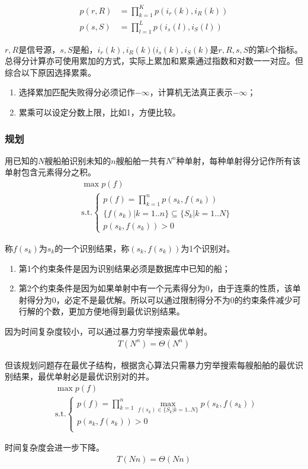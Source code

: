 \begin{align}
	p(r,R)	&	=\prod\limits_{k=1}^Kp(i_r(k),i_R(k))	\\
	p(s,S)	&	=\prod\limits_{l=1}^Lp(i_s(l),i_S(l))
\end{align}
\par \(r,R\)是信号源，\(s,S\)是船，\(i_r(k),i_R(k)(i_s(k),i_S(k)\)是\(r,R,s,S\)的第\(k\)个指标。
\\\indent 总得分计算亦可使用累加的方式，实际上累加和累乘通过指数和对数一一对应。但综合以下原因选择累乘。
\begin{enumerate}
	\item 选择累加匹配失败得分必须记作\(-\infty\)，计算机无法真正表示\(-\infty\)；
	\item 累乘可以设定分数上限，比如1，方便比较。
\end{enumerate}
\subsubsection{规划}
用已知的\(N\)艘船舶识别未知的\(n\)艘船舶一共有\(N^n\)种单射，每种单射得分记作所有该单射包含元素得分之积。
\begin{align}
	&	\max p(f)		\\
	&	\mathrm{s.t.}
	\begin{cases}
		p(f)=\prod\limits_{k=1}^np(s_k,f(s_k))		\\
		\{f(s_k)|k=1..n\}\subseteq\{S_k|k=1..N\}		\\
		p(s_k,f(s_k))>0
	\end{cases}
\end{align}
\par 称\(f(s_k)\)为\(s_k\)的一个识别结果，称\((s_k,f(s_k))\)为1个识别对。
\begin{enumerate}
	\item 第1个约束条件是因为识别结果必须是数据库中已知的船；
	\item 第2个约束条件是因为如果单射中有一个元素得分为0，由于连乘的性质，该单射得分为0，必定不是最优解。所以可以通过限制得分不为0的约束条件减少可行解的个数，更加方便地得到最优识别结果。
\end{enumerate}
\par 因为时间复杂度较小，可以通过暴力穷举搜索最优单射。
\begin{align}
	T(N^n)=\Theta(N^n)
\end{align}
\par 但该规划问题存在最优子结构，根据贪心算法只需暴力穷举搜索每艘船舶的最优识别结果，最优单射必是最优识别对的并。
\begin{align}
	&	\max p(f)		\\
	&	\mathrm{s.t.}
	\begin{cases}
		p(f)=\prod\limits_{k=1}^n\max\limits_{f(s_k)\in\{S_k|k=1..N\}}p(s_k,f(s_k))	\\
		p(s_k,f(s_k))>0												\\
	\end{cases}
\end{align}
\par 时间复杂度会进一步下降。
\begin{align}
	T(Nn)=\Theta(Nn)
\end{align}
